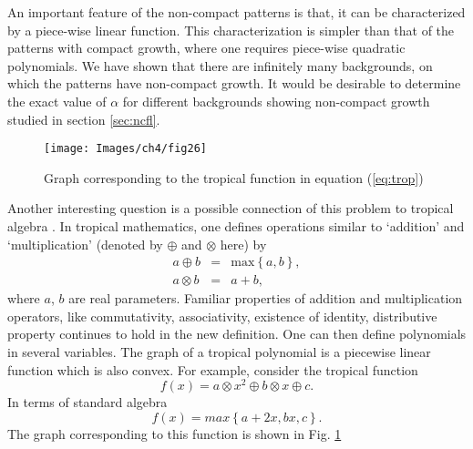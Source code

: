 \documentclass[11pt,a4paper]{book}
\begin{document}
An important feature of the non-compact patterns is that,
it can be characterized by a piece-wise
linear function. This characterization is simpler than that of the
patterns with compact growth, where one requires piece-wise quadratic
polynomials. We have shown that there are
infinitely many backgrounds, on which the patterns have non-compact growth.
It would be desirable to determine  the exact value of $\alpha$ for
different backgrounds showing non-compact growth  studied in section
\ref{sec:ncfl}.
%
\begin{figure}[t]
\begin{center}
\texttt{[image: Images/ch4/fig26]}
\caption{Graph corresponding to the tropical function in equation
(\ref{eq:trop})}
\label{fig:trop}
\end{center}
\end{figure}
%

Another interesting question is a possible connection of this
problem to tropical algebra \cite{tropical}. In tropical mathematics, one defines
operations similar to `addition' and `multiplication' (denoted by $\oplus$ and
$\otimes$ here) by
\begin{eqnarray}
a\oplus b&=&\textrm{max}\left\{ a,b \right\},\nonumber\\
a\otimes b&=&a+b,
\end{eqnarray}
where $a$, $b$ are real parameters.
Familiar properties of addition and multiplication operators, like
commutativity, associativity, existence of identity, distributive
property continues to hold in the new definition. One can then define
polynomials in several variables. The graph of a tropical polynomial
is a piecewise linear function which is also convex. For example, consider the
tropical function
\begin{equation}
f(x)=a\otimes x^{2}\oplus b \otimes x \oplus c.
\label{eq:trop}
\end{equation}
In terms of standard algebra
\begin{equation}
f(x)=max\left\{ a+2x,bx,c\right\}.
\end{equation}
The graph corresponding to this function is shown in Fig. \ref{fig:trop}
\end{document}
